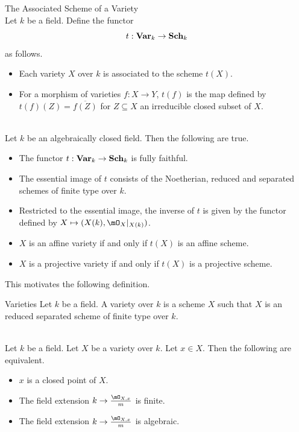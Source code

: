 \documentclass[a4paper]{article}
\begin{document}
\begin{defn}{The Associated Scheme of a Variety}{}\\
Let $k$ be a field. Define the functor $$t:\bold{Var}_k\to\bold{Sch}_k$$ as follows. 
\begin{itemize}
\item Each variety $X$ over $k$ is associated to the scheme $t(X)$. 
\item For a morphism of varieties $f:X\to Y$, $t(f)$ is the map defined by $t(f)(Z)=\overline{f(Z)}$ for $Z\subseteq X$ an irreducible closed subset of $X$. 
\end{itemize}
\end{defn}

\begin{prp}{}{}\\
Let $k$ be an algebraically closed field. Then the following are true. 
\begin{itemize}
\item The functor $t:\bold{Var}_k\to\bold{Sch}_k$ is fully faithful. 
\item The essential image of $t$ consists of the Noetherian, reduced and separated schemes of finite type over $k$. 
\item Restricted to the essential image, the inverse of $t$ is given by the functor defined by $X\mapsto(X(k),\mO_X|_{X(k)})$. 
\item $X$ is an affine variety if and only if $t(X)$ is an affine scheme. 
\item $X$ is a projective variety if and only if $t(X)$ is a projective scheme. 
\end{itemize}
\end{prp}

This motivates the following definition. 

\begin{defn}{Varieties}{} Let $k$ be a field. A variety over $k$ is a scheme $X$ such that $X$ is an reduced separated scheme of finite type over $k$. 
\end{defn}

\begin{lmm}{}{}\\
Let $k$ be a field. Let $X$ be a variety over $k$. Let $x\in X$. Then the following are equivalent. 
\begin{itemize}
\item $x$ is a closed point of $X$. 
\item The field extension $k\to\frac{\mO_{X,x}}{m}$ is finite. 
\item The field extension $k\to\frac{\mO_{X,x}}{m}$ is algebraic. 
\end{itemize}
\end{lmm}
\end{document}
